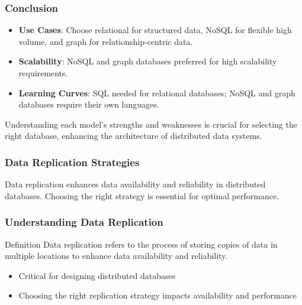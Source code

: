 \documentclass[aspectratio=169]{beamer}
\begin{document}
\begin{frame}
    \frametitle{Conclusion}
    \begin{itemize}
        \item \textbf{Use Cases}: Choose relational for structured data, NoSQL for flexible high volume, and graph for relationship-centric data.
        \item \textbf{Scalability}: NoSQL and graph databases preferred for high scalability requirements.
        \item \textbf{Learning Curves}: SQL needed for relational databases; NoSQL and graph databases require their own languages.
    \end{itemize}
    
    Understanding each model's strengths and weaknesses is crucial for selecting the right database, enhancing the architecture of distributed data systems.
\end{frame}

\begin{frame}[fragile]
    \frametitle{Data Replication Strategies}
    Data replication enhances data availability and reliability in distributed databases. Choosing the right strategy is essential for optimal performance.
\end{frame}

\begin{frame}[fragile]
    \frametitle{Understanding Data Replication}
    \begin{block}{Definition}
        Data replication refers to the process of storing copies of data in multiple locations to enhance data availability and reliability.
    \end{block}
    
    \begin{itemize}
        \item Critical for designing distributed databases
        \item Choosing the right replication strategy impacts availability and performance
    \end{itemize}
\end{frame}
\end{document}
